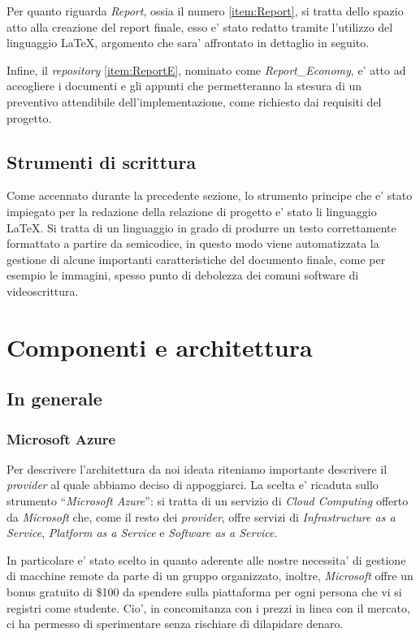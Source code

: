 \documentclass[a4paper]{report}
\newcommand{\quotes}[1]{``#1''}
\begin{document}
		Per quanto riguarda \emph{Report}, ossia il numero \ref{item:Report}, si tratta dello spazio atto alla creazione
		del report finale, esso e' stato redatto tramite l'utilizzo del linguaggio \LaTeX{}, argomento che sara'
		affrontato in dettaglio in seguito.

		Infine, il \emph{repository} \ref{item:ReportE}, nominato come \emph{Report\_Economy}, e' atto ad accogliere i
		documenti e gli appunti che permetteranno la stesura di un preventivo attendibile dell'implementazione, come
		richiesto dai requisiti del progetto.
	\section{Strumenti di scrittura}\label{strumenti_di_scrittura}
		Come accennato durante la precedente sezione, lo strumento principe che e' stato impiegato per la redazione
		della relazione di progetto e' stato li linguaggio \LaTeX{}. Si tratta di un linguaggio in grado di produrre un
		testo correttamente formattato a partire da semicodice, in questo modo viene automatizzata la gestione di alcune
		importanti caratteristiche del documento finale, come per esempio le immagini, spesso punto di debolezza dei
		comuni software di videoscrittura.
\chapter{Componenti e architettura}\label{componenti_e_architettura}
	\section{In generale}\label{in_generale}
		\subsection{Microsoft Azure}\label{microsoft_azure}
			Per descrivere l'architettura da noi ideata riteniamo importante descrivere il \emph{provider} al quale
			abbiamo deciso di appoggiarci. La scelta e' ricaduta sullo strumento \quotes{\emph{Microsoft Azure}}: si
			tratta di un servizio di \emph{Cloud Computing} offerto da \emph{Microsoft} che, come il resto dei
			\emph{provider}, offre servizi di \emph{Infrastructure as a Service}, \emph{Platform as a Service} e
			\emph{Software as a Service}.


			In particolare e' stato scelto in quanto aderente alle nostre necessita' di gestione di macchine remote da
			parte di un gruppo organizzato, inoltre, \emph{Microsoft} offre un bonus gratuito di \$100 da spendere
			sulla piattaforma per ogni persona che vi si registri come studente. Cio', in concomitanza con i prezzi in
			linea con il mercato, ci ha permesso di sperimentare senza rischiare di dilapidare denaro.
\end{document}
